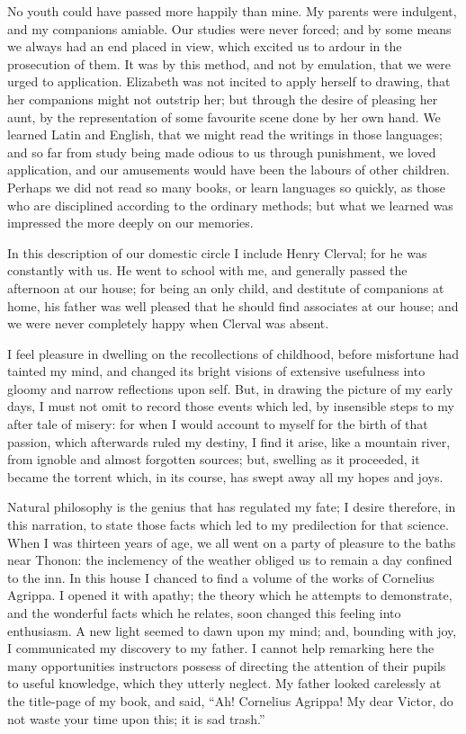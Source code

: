 No youth could have passed more
happily than mine. My parents were
indulgent, and my companions amiable.
Our studies were never forced; and by
some means we always had an end
placed in view, which excited us to ardour
in the prosecution of them. It
was by this method, and not by emulation,
that we were urged to application.
Elizabeth was not incited to apply herself
to drawing, that her companions
might not outstrip her; but through the
desire of pleasing her aunt, by the
representation of some favourite scene
done by her own hand. We learned
Latin and English, that we might read
the writings in those languages; and
so far from study being made odious to
us through punishment, we loved application,
and our amusements would
have been the labours of other children.
Perhaps we did not read so
many books, or learn languages so
quickly, as those who are disciplined
according to the ordinary methods; but
what we learned was impressed the
more deeply on our memories.

In this description of our domestic
circle I include Henry Clerval; for he
was constantly with us. He went to
school with me, and generally passed
the afternoon at our house; for being
an only child, and destitute of companions
at home, his father was well
pleased that he should find associates at
our house; and we were never completely
happy when Clerval was absent.

I feel pleasure in dwelling on the recollections
of childhood, before misfortune
had tainted my mind, and changed
its bright visions of extensive usefulness
into gloomy and narrow reflections
upon self. But, in drawing the picture
of my early days, I must not omit to
record those events which led, by insensible
steps to my after tale of misery:
for when I would account to myself for
the birth of that passion, which afterwards
ruled my destiny, I find it arise,
like a mountain river, from ignoble
and almost forgotten sources; but,
swelling as it proceeded, it became the
torrent which, in its course, has swept
away all my hopes and joys.

Natural philosophy is the genius that
has regulated my fate; I desire therefore,
in this narration, to state those facts
which led to my predilection for that
science. When I was thirteen years of
age, we all went on a party of pleasure
to the baths near Thonon: the inclemency
of the weather obliged us to remain
a day confined to the inn. In
this house I chanced to find a volume
of the works of Cornelius Agrippa. I
opened it with apathy; the theory which
he attempts to demonstrate, and the
wonderful facts which he relates, soon
changed this feeling into enthusiasm.
A new light seemed to dawn upon my
mind; and, bounding with joy, I communicated
my discovery to my father.
I cannot help remarking here the many
opportunities instructors possess of directing
the attention of their pupils to
useful knowledge, which they utterly
neglect. My father looked carelessly
at the title-page of my book, and said,
``Ah! Cornelius Agrippa! My dear
Victor, do not waste your time upon
this; it is sad trash.''

